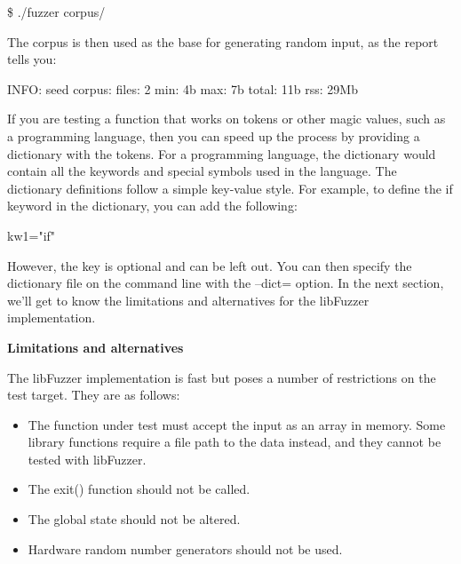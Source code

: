 \begin{tcolorbox}[colback=white,colframe=black]
\$ ./fuzzer corpus/
\end{tcolorbox}

The corpus is then used as the base for generating random input, as the report tells you:\par

\begin{tcolorbox}[colback=white,colframe=black]
INFO: seed corpus: files: 2 min: 4b max: 7b total: 11b rss: 29Mb
\end{tcolorbox}

If you are testing a function that works on tokens or other magic values, such as a programming language, then you can speed up the process by providing a dictionary with the tokens. For a programming language, the dictionary would contain all the keywords and special symbols used in the language. The dictionary definitions follow a simple key-value style. For example, to define the if keyword in the dictionary, you can add the following:\par

\begin{tcolorbox}[colback=white,colframe=black]
kw1="if"
\end{tcolorbox}

However, the key is optional and can be left out. You can then specify the dictionary file on the command line with the –dict= option. In the next section, we'll get to know the limitations and alternatives for the libFuzzer implementation.\par

\hspace*{\fill} \par %
\textbf{Limitations and alternatives}

The libFuzzer implementation is fast but poses a number of restrictions on the test target. They are as follows:\par


\begin{itemize}
\item The function under test must accept the input as an array in memory. Some library functions require a file path to the data instead, and they cannot be tested with libFuzzer.

\item The exit() function should not be called.

\item The global state should not be altered.

\item Hardware random number generators should not be used.
\end{itemize}

